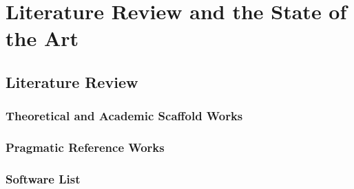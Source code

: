 
\chapter{Literature Review and the State of the Art} %

\label{Chapter2} %



\section{Literature Review}

\subsection{Theoretical and Academic Scaffold Works}

\subsection{Pragmatic Reference Works}

\subsection{Software List}